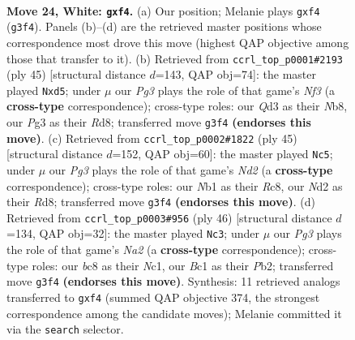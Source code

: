 \documentclass[11pt]{article}
\begin{document}
\clearpage

\begin{figure}[p]\centering
\begin{subfigure}{0.46\textwidth}\centering
\resizebox{\linewidth}{!}{%
\newchessgame
\chessboard[
  setfen={r1b1r1k1/p2nb2p/2p5/3q4/Pp1p1p2/1P1Q2P1/3NPK2/RNBR4 w - - 0 24},
  showmover=false,
  pgfstyle=straightmove, color=movearrow, markmove={g3-f4}
]}
\caption{}
\end{subfigure}\hfill
\begin{subfigure}{0.46\textwidth}\centering
\resizebox{\linewidth}{!}{%
\newchessgame
\chessboard[
  setfen={rn1r2k1/2q1bpp1/2P2n2/pB1P4/P6p/1N1QB3/1P4PP/2R1K1R1 b - - 2 23},
  showmover=false,
  pgfstyle=straightmove, color=movearrow, markmove={f6-d5}
]}
\caption{}
\end{subfigure}
\\[4pt]
\begin{subfigure}{0.46\textwidth}\centering
\resizebox{\linewidth}{!}{%
\newchessgame
\chessboard[
  setfen={2rr2k1/R2n1pp1/1pbqpn1p/8/3P4/2PB1N1P/3BQPP1/3R2K1 b - - 6 23},
  showmover=false,
  pgfstyle=straightmove, color=movearrow, markmove={d7-c5}
]}
\caption{}
\end{subfigure}\hfill
\begin{subfigure}{0.46\textwidth}\centering
\resizebox{\linewidth}{!}{%
\newchessgame
\chessboard[
  setfen={4k2r/1b3p2/pqnppp1b/8/r3PP1P/3B3R/NPPQ4/1KNR4 w - - 11 24},
  showmover=false,
  pgfstyle=straightmove, color=movearrow, markmove={a2-c3}
]}
\caption{}
\end{subfigure}
\caption{\textbf{Move 24, White: \texttt{gxf4}.} (a) Our position; Melanie plays \texttt{gxf4} (\texttt{g3f4}). Panels (b)--(d) are the retrieved master positions whose correspondence most drove this move (highest QAP objective among those that transfer to it). (b) Retrieved from \texttt{ccrl\_top\_p0001\#2193} (ply 45) [structural distance $d$=143, QAP obj=74]: the master played \texttt{Nxd5}; under $\mu$ our \emph{Pg3} plays the role of that game's \emph{Nf3} (a \textbf{cross-type} correspondence); cross-type roles: our \emph{Q}d3 as their \emph{N}b8, our \emph{P}g3 as their \emph{R}d8; transferred move \texttt{g3f4} \textbf{(endorses this move)}. (c) Retrieved from \texttt{ccrl\_top\_p0002\#1822} (ply 45) [structural distance $d$=152, QAP obj=60]: the master played \texttt{Nc5}; under $\mu$ our \emph{Pg3} plays the role of that game's \emph{Nd2} (a \textbf{cross-type} correspondence); cross-type roles: our \emph{N}b1 as their \emph{R}c8, our \emph{N}d2 as their \emph{R}d8; transferred move \texttt{g3f4} \textbf{(endorses this move)}. (d) Retrieved from \texttt{ccrl\_top\_p0003\#956} (ply 46) [structural distance $d$=134, QAP obj=32]: the master played \texttt{Nc3}; under $\mu$ our \emph{Pg3} plays the role of that game's \emph{Na2} (a \textbf{cross-type} correspondence); cross-type roles: our \emph{b}c8 as their \emph{N}c1, our \emph{B}c1 as their \emph{P}b2; transferred move \texttt{g3f4} \textbf{(endorses this move)}. Synthesis: 11 retrieved analogs transferred to \texttt{gxf4} (summed QAP objective 374, the strongest correspondence among the candidate moves); Melanie committed it via the \texttt{search} selector.}
\label{fig:thought-m46}
\end{figure}
\end{document}
